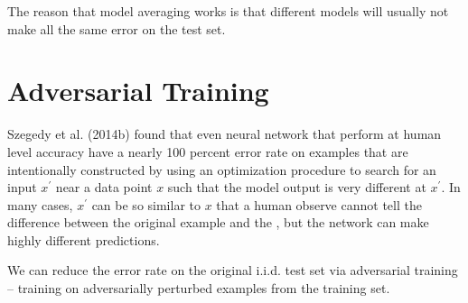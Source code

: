 The reason that model averaging works is that different models will usually not make all the same error on the test set.


\section{Adversarial Training}

Szegedy et al. (2014b) found that even neural network that perform at human level accuracy have a nearly 100 percent error rate on examples that are intentionally constructed by using an optimization procedure to search for an input $x^{'}$ near a data point $x$ such that the model output is very different at $x^{'}$.
In many cases, $x^{'}$ can be so similar to $x$ that a human observe cannot tell the difference between the original example and the , but the network can make highly different predictions.


We can reduce the error rate on the original i.i.d. test set via adversarial training -- training on adversarially perturbed examples from the training set.